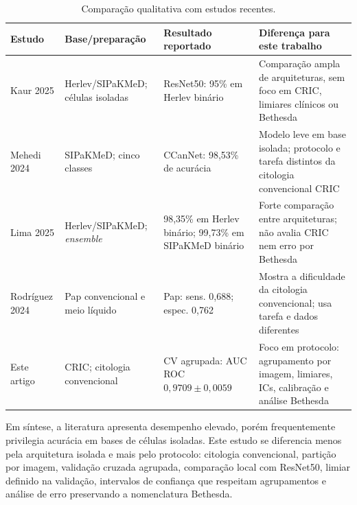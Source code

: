 \begin{table}[ht]
\centering
\caption{Comparação qualitativa com estudos recentes.}
\label{tab:comparacao-literatura}
\scriptsize
\setlength{\tabcolsep}{3pt}
\begin{tabular}{p{2.1cm}p{2.25cm}p{2.45cm}p{3.9cm}}
\toprule
Estudo & Base/preparação & Resultado reportado & Diferença para este trabalho \\
\midrule
Kaur 2025 & Herlev/SIPaKMeD; células isoladas &
ResNet50: 95\% em Herlev binário & Comparação ampla de arquiteturas, sem foco
em CRIC, limiares clínicos ou Bethesda \\
Mehedi 2024 & SIPaKMeD; cinco classes &
CCanNet: 98,53\% de acurácia & Modelo leve em base isolada; protocolo e tarefa
distintos da citologia convencional CRIC \\
Lima 2025 & Herlev/SIPaKMeD; \emph{ensemble} &
98,35\% em Herlev binário; 99,73\% em SIPaKMeD binário & Forte comparação
entre arquiteturas; não avalia CRIC nem erro por Bethesda \\
Rodríguez 2024 & Pap convencional e meio
líquido & Pap: sens. 0,688; espec. 0,762 & Mostra a dificuldade da citologia
convencional; usa tarefa e dados diferentes \\
Este artigo & CRIC; citologia convencional & CV agrupada: AUC ROC
$0{,}9709\pm0{,}0059$ & Foco em protocolo: agrupamento por imagem, limiares,
ICs, calibração e análise Bethesda \\
\bottomrule
\end{tabular}
\end{table}

Em síntese, a literatura apresenta desempenho elevado, porém frequentemente
privilegia acurácia em bases de células isoladas. Este estudo se diferencia
menos pela arquitetura isolada e mais pelo protocolo: citologia convencional,
partição por imagem, validação cruzada agrupada, comparação local com ResNet50,
limiar definido na validação, intervalos de confiança que respeitam
agrupamentos e análise de erro preservando a nomenclatura Bethesda.
